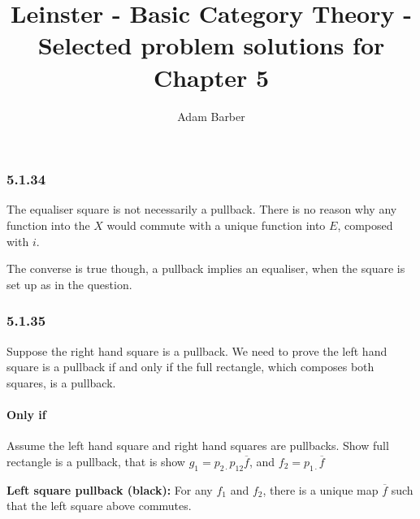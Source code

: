 \documentclass{article}
\begin{document}
\title{Leinster - Basic Category Theory - Selected problem solutions for Chapter 5}
\author{Adam Barber}

\maketitle

\subsubsection*{5.1.34}

The equaliser square is not necessarily a pullback. There is no reason why any function into the $X$ would commute with a unique function into $E$, composed with $i$.

The converse is true though, a pullback implies an equaliser, when the square is set up as in the question.

\subsubsection*{5.1.35}

Suppose the right hand square is a pullback. We need to prove the left hand square is a pullback if and only if the full rectangle, which composes both squares, is a pullback.

\paragraph{Only if}

Assume the left hand square and right hand squares are pullbacks. Show full rectangle is a pullback, that is show $g_1 = p_{2\cdot}p_{12}\overline{f}$, and $f_2 = p_{1\cdot}\overline{f}$


\textbf{Left square pullback (black):} For any $f_1$ and $f_2$, there is a unique map $\overline{f}$ such that the left square above commutes.
\end{document}
